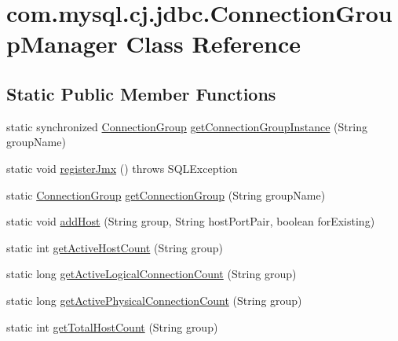 \hypertarget{classcom_1_1mysql_1_1cj_1_1jdbc_1_1_connection_group_manager}{}\section{com.\+mysql.\+cj.\+jdbc.\+Connection\+Group\+Manager Class Reference}
\label{classcom_1_1mysql_1_1cj_1_1jdbc_1_1_connection_group_manager}
\subsection*{Static Public Member Functions}
\begin{DoxyCompactItemize}
\item 
static synchronized \mbox{\hyperlink{classcom_1_1mysql_1_1cj_1_1jdbc_1_1_connection_group}{Connection\+Group}} \mbox{\hyperlink{classcom_1_1mysql_1_1cj_1_1jdbc_1_1_connection_group_manager_ad20f5bdc74ab930e93fb687718f5be3d}{get\+Connection\+Group\+Instance}} (String group\+Name)
\item 
static void \mbox{\hyperlink{classcom_1_1mysql_1_1cj_1_1jdbc_1_1_connection_group_manager_ac045989c3b6ddad6154fef6b04bb34b6}{register\+Jmx}} ()  throws S\+Q\+L\+Exception 
\item 
static \mbox{\hyperlink{classcom_1_1mysql_1_1cj_1_1jdbc_1_1_connection_group}{Connection\+Group}} \mbox{\hyperlink{classcom_1_1mysql_1_1cj_1_1jdbc_1_1_connection_group_manager_a0a780ce6ad7aeb4b54bdafadaa41548e}{get\+Connection\+Group}} (String group\+Name)
\item 
static void \mbox{\hyperlink{classcom_1_1mysql_1_1cj_1_1jdbc_1_1_connection_group_manager_a63735dc43c2b4813bf7f9643abd06aad}{add\+Host}} (String group, String host\+Port\+Pair, boolean for\+Existing)
\item 
static int \mbox{\hyperlink{classcom_1_1mysql_1_1cj_1_1jdbc_1_1_connection_group_manager_a3d5af875c1074d121ad1f31cb2bbd7eb}{get\+Active\+Host\+Count}} (String group)
\item 
static long \mbox{\hyperlink{classcom_1_1mysql_1_1cj_1_1jdbc_1_1_connection_group_manager_a7598399b0c4cdfb92b6b773e2d46ac2a}{get\+Active\+Logical\+Connection\+Count}} (String group)
\item 
static long \mbox{\hyperlink{classcom_1_1mysql_1_1cj_1_1jdbc_1_1_connection_group_manager_af68850f487d717d85f03f94040723ecc}{get\+Active\+Physical\+Connection\+Count}} (String group)
\item 
static int \mbox{\hyperlink{classcom_1_1mysql_1_1cj_1_1jdbc_1_1_connection_group_manager_a3c592e14c0ec43ccb219a4b043b24a20}{get\+Total\+Host\+Count}} (String group)

\end{DoxyCompactItemize}
